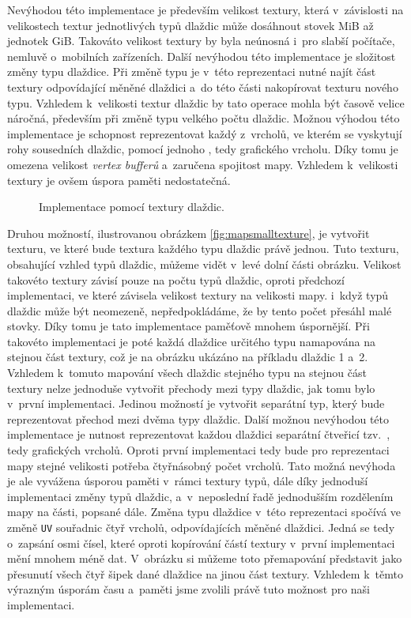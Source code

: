 Nevýhodou této implementace je především velikost textury, která v~závislosti na velikostech textur jednotlivých typů dlaždic může dosáhnout stovek MiB až jednotek GiB. Takováto velikost textury by byla neúnosná i~pro slabší počítače, nemluvě o~mobilních zařízeních. Další nevýhodou této implementace je složitost změny typu dlaždice. Při změně typu je v~této reprezentaci nutné najít část textury odpovídající měněné dlaždici a~do této části nakopírovat texturu nového typu. Vzhledem k~velikosti textur dlaždic by tato operace mohla být časově velice náročná, především při změně typu velkého počtu dlaždic. Možnou výhodou této implementace je schopnost reprezentovat každý z~vrcholů, ve kterém se vyskytují rohy sousedních dlaždic, pomocí jednoho , tedy grafického vrcholu. Díky tomu je omezena velikost \textit{vertex bufferů} a~zaručena spojitost mapy. Vzhledem k~velikosti textury je ovšem úspora paměti nedostatečná.

\begin{figure}[h]
	\centering
	
	\caption{Implementace pomocí textury dlaždic.}
	\label{fig:mapbigtexture}
\end{figure}

Druhou možností, ilustrovanou obrázkem \ref{fig:mapsmalltexture}, je vytvořit texturu, ve které bude textura každého typu dlaždic právě jednou. Tuto texturu, obsahující vzhled typů dlaždic, můžeme vidět v~levé dolní části obrázku. Velikost takovéto textury závisí pouze na počtu typů dlaždic, oproti předchozí implementaci, ve které závisela velikost textury na velikosti mapy. i~když typů dlaždic může být neomezeně, nepředpokládáme, že by tento počet přesáhl malé stovky. Díky tomu je tato implementace paměťově mnohem úspornější. Při takovéto implementaci je poté každá dlaždice určitého typu namapována na stejnou část textury, což je na obrázku ukázáno na příkladu dlaždic 1 a~2. Vzhledem k~tomuto mapování všech dlaždic stejného typu na stejnou část textury nelze jednoduše vytvořit přechody mezi typy dlaždic, jak tomu bylo v~první implementaci. Jedinou možností je vytvořit separátní typ, který bude reprezentovat přechod mezi dvěma typy dlaždic. Další možnou nevýhodou této implementace je nutnost reprezentovat každou dlaždici separátní čtveřicí tzv.~, tedy grafických vrcholů. Oproti první implementaci tedy bude pro reprezentaci mapy stejné velikosti potřeba čtyřnásobný počet vrcholů. Tato možná nevýhoda je ale vyvážena úsporou paměti v~rámci textury typů, dále díky jednoduší implementaci změny typů dlaždic, a~v~neposlední řadě jednodušším rozdělením mapy na části, popsané dále. Změna typu dlaždice v~této reprezentaci spočívá ve změně \texttt{UV} souřadnic čtyř vrcholů, odpovídajících měněné dlaždici. Jedná se tedy o~zapsání osmi čísel, které oproti kopírování částí textury v~první implementaci mění mnohem méně dat. V~obrázku si můžeme toto přemapování představit jako přesunutí všech čtyř šipek dané dlaždice na jinou část textury. Vzhledem k~těmto výrazným úsporám času a~paměti jsme zvolili právě tuto možnost pro naši implementaci.

